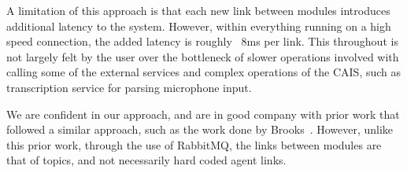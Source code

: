 A limitation of this approach is that each new link between modules introduces
additional latency to the system. However, within everything running on a high
speed connection, the added latency is roughly ~8ms per link. This throughout
is not largely felt by the user over the bottleneck of slower operations
involved with calling some of the external services and complex operations
of the CAIS, such as transcription service for parsing microphone input.

We are confident in our approach, and are in good company with  prior work that
followed a similar approach, such as the work done by
Brooks~\cite{brooks_intelligent_1997}. However, unlike this prior work, through
the use of RabbitMQ, the links between modules are that of topics, and not
necessarily hard coded agent links.
